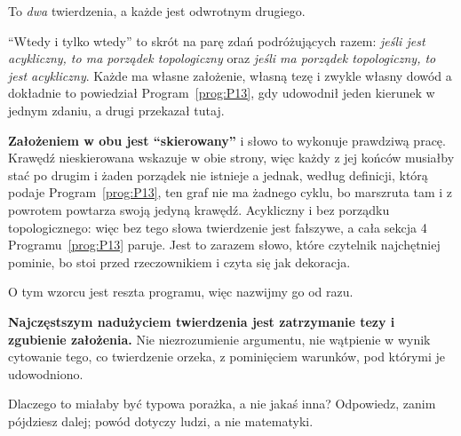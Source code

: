\begin{fr}
\begin{ansblock}
To \emph{dwa} twierdzenia, a każde jest odwrotnym drugiego.
\end{ansblock}

\enquote{Wtedy i tylko wtedy} to skrót na parę zdań podróżujących razem:
\emph{jeśli jest acykliczny, to ma porządek topologiczny} oraz \emph{jeśli ma
porządek topologiczny, to jest acykliczny}. Każde ma własne założenie, własną
tezę i zwykle własny dowód \dash{} a dokładnie to powiedział
Program~\ref{prog:P13}, gdy udowodnił jeden kierunek w jednym zdaniu, a drugi
przekazał tutaj.

\textbf{Założeniem w obu jest \enquote{skierowany}} i słowo to wykonuje
prawdziwą pracę. Krawędź nieskierowana wskazuje w obie strony, więc każdy z
jej końców musiałby stać po drugim i żaden porządek nie istnieje \dash{} a
jednak, według definicji, którą podaje Program~\ref{prog:P13}, ten graf nie ma
żadnego cyklu, bo marszruta tam i z powrotem powtarza swoją jedyną krawędź.
Acykliczny i bez porządku topologicznego: więc bez tego słowa twierdzenie jest
fałszywe, a cała sekcja 4 Programu~\ref{prog:P13} paruje. Jest to zarazem
słowo, które czytelnik najchętniej pominie, bo stoi przed rzeczownikiem i
czyta się jak dekoracja.
\end{fr}

\begin{fr}
O tym wzorcu jest reszta programu, więc nazwijmy go od razu.

\textbf{Najczęstszym nadużyciem twierdzenia jest zatrzymanie tezy i zgubienie
założenia.} Nie niezrozumienie argumentu, nie wątpienie w wynik \dash{}
cytowanie tego, co twierdzenie orzeka, z pominięciem warunków, pod którymi je
udowodniono.

Dlaczego to miałaby być typowa porażka, a nie jakaś inna? Odpowiedz, zanim
pójdziesz dalej; powód dotyczy ludzi, a nie matematyki.
\nextframe
\end{fr}

